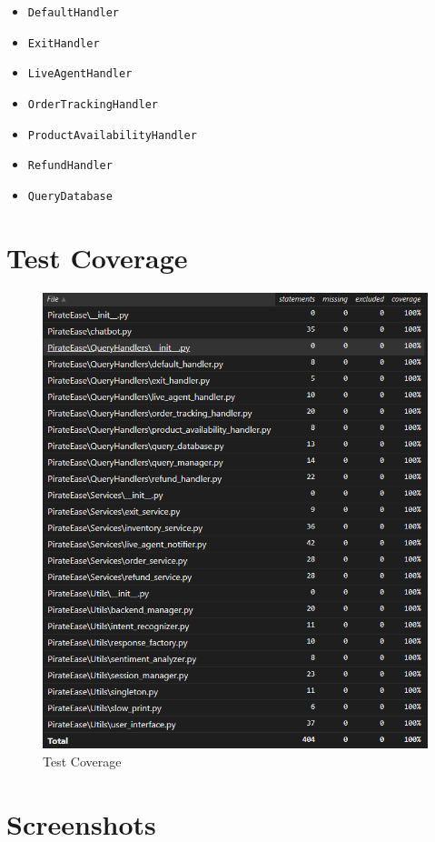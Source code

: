\documentclass[11pt]{article}
\begin{document}
\begin{itemize}
	\item \texttt{DefaultHandler}
	\item \texttt{ExitHandler}
	\item \texttt{LiveAgentHandler}
	\item \texttt{OrderTrackingHandler}
	\item \texttt{ProductAvailabilityHandler}
	\item \texttt{RefundHandler}
	\item \texttt{QueryDatabase}
\end{itemize}

\newpage

\section{Test Coverage}
\begin{figure}[h!]
    \centering
    \includegraphics[width=\textwidth]{test_coverage.png}
    \caption{Test Coverage}
\end{figure}	


\section{Screenshots}
\end{document}
